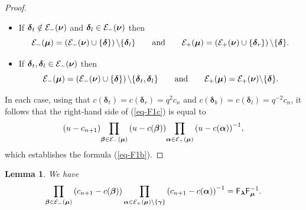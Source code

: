 \documentclass[pdftex]{sigma}
\newcommand{\lam}{\boldsymbol{\lambda}}
\newcommand{\num}{\boldsymbol{\nu}}
\newcommand{\mum}{\boldsymbol{\mu}}
\newcommand{\alm}{\boldsymbol{\alpha}}
\newcommand{\bem}{\boldsymbol{\beta}}
\newcommand{\gam}{\boldsymbol{\gamma}}
\newcommand{\dem}{\boldsymbol{\delta}}
\newtheorem{Lemma}[Theorem]{Lemma}
\begin{document}
\begin{proof}
\begin{itemize}
\item If $\dem_t\notin {\cal{E}}_-(\num)$ and $\dem_l\in {\cal{E}}_-(\num)$ then \[{\cal{E}}_-(\mum)=\left({\cal{E}}_-(\num)\cup\{\dem\}\right)\backslash\{\dem_l\}\qquad\textrm{and}\qquad {\cal{E}}_+(\mum)=\left({\cal{E}}_+(\num)\cup\{\dem_r\}\right)\backslash\{\dem\}  .\]

\item If $\dem_t,\dem_l\in {\cal{E}}_-(\num)$ then \[{\cal{E}}_-(\mum)=\left({\cal{E}}_-(\num)\cup\{\dem\}\right)\backslash\{\dem_t,\dem_l\}\qquad\textrm{and}\qquad {\cal{E}}_+(\mum)={\cal{E}}_+(\num)\backslash\{\dem\}  .\]
\end{itemize}
In each case,
using that $c(\dem_t)=c(\dem_r)=q^2c_n$ and $c(\dem_b)=c(\dem_l)=q^{-2}c_n$,
it follows that the right-hand side of (\ref{eq-F1c}) is equal to
\[(u-c_{n+1}) {\prod_{\bem\in {\cal{E}}_-(\mum)}\left(u-c(\bem)\right)} {\prod_{\alm\in {\cal{E}}_+(\mum)}\left(u-c(\alm)\right)^{-1}} ,
\]
which establishes the formula (\ref{eq-F1b}).
\end{proof}

\begin{Lemma}\label{lemm-f1}
We have
\begin{gather*}%
\prod_{\bem\in {\cal{E}}_-(\mum)}\left(c_{n+1}-c(\bem)\right)\prod_{\alm\in {\cal{E}}_+(\mum)\backslash\{\gam\}}\left(c_{n+1}-c(\alm)\right)^{-1}=\mathsf{F}_{\lam} \mathsf{F}_{\mum}^{-1}  .
\end{gather*}
\end{Lemma}
\end{document}
